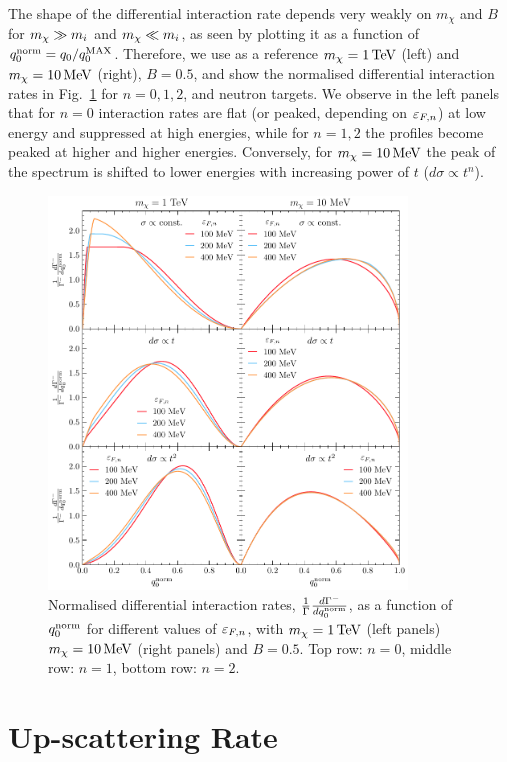 The shape of the differential interaction rate depends very weakly on $m_\chi$ and $B$ for $m_\chi\gg m_i$ and $m_\chi \ll m_i$, as seen by plotting it as a function of $q_0^{\rm norm}=q_0/q_0^{\rm MAX}$. Therefore, we use as a reference $m_\chi=1{\rm \,TeV}$ (left) and $m_\chi=10{\rm \,MeV}$ (right),  $B=0.5$, and show the normalised differential interaction rates in Fig.~\ref{app:fig:diffgamma} for $n=0,1,2$, and neutron targets.
We observe in the left panels that for $n=0$ interaction rates are flat (or peaked, depending on $\varepsilon_{F,n}$) at low energy and suppressed at high energies, while for $n=1,2$ the profiles become peaked at higher and higher energies. Conversely, for $m_\chi=10{\rm \,MeV}$ the peak of the spectrum is shifted to lower energies with increasing power of $t$ ($d\sigma\propto t^n$).

\begin{figure}
    \centering
    \includegraphics[width = 0.85\textwidth]{img/chapter_3/capture_1/norm_diff_intrate_n.pdf}
    \caption{Normalised differential interaction rates, $\frac{1}{\Gamma}\frac{d\Gamma^-}{dq_0^{\rm norm}}$, as a function of $q_0^{\rm norm}$ for different values of $\varepsilon_{F,n}$, with $m_\chi=1{\rm \,TeV}$ (left panels) $m_\chi=10{\rm \,MeV}$ (right panels) and $B=0.5$. Top row: $n=0$, middle row: $n=1$, bottom row: $n=2$.}
    \label{app:fig:diffgamma}
\end{figure}

\section{Up-scattering Rate}
\label{app:subsec:up_scatter_derivation}

